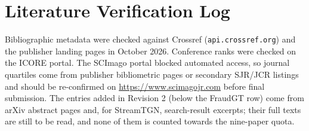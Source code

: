 \documentclass[11pt,a4paper]{article}
\begin{document}
\section{Literature Verification Log}
\label{app:verification}

Bibliographic metadata were checked against Crossref (\texttt{api.crossref.org}) and the publisher landing pages in October 2026. Conference ranks were checked on the ICORE portal. The SCImago portal blocked automated access, so journal quartiles come from publisher bibliometric pages or secondary SJR/JCR listings and should be re-confirmed on \url{https://www.scimagojr.com} before final submission. The entries added in Revision 2 (below the FraudGT row) come from arXiv abstract pages and, for StreamTGN, search-result excerpts; their full texts are still to be read, and none of them is counted towards the nine-paper quota.
\end{document}
